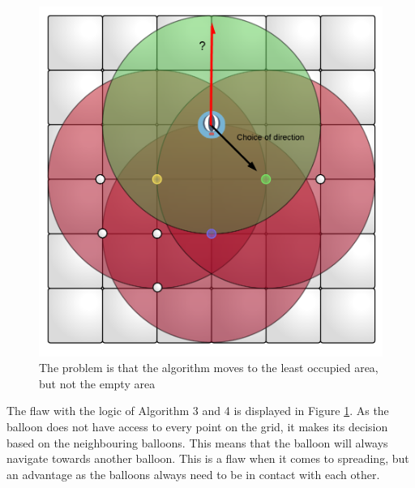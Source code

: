 \begin{figure}
\centering
\includegraphics[scale = 0.3]{graphics/errorWithLogicCritical.pdf}
\caption{The problem is that the algorithm moves to the least occupied area, but not the empty area}
\label{fig:errorLogic}
\end{figure}

The flaw with the logic of Algorithm 3 and 4 is displayed in Figure \ref{fig:errorLogic}. As the balloon does not have access to every point on the grid, it makes its decision based on the neighbouring balloons. This means that the balloon will always navigate towards another balloon. This is a flaw when it comes to spreading, but an advantage as the balloons always need to be in contact with each other. 

